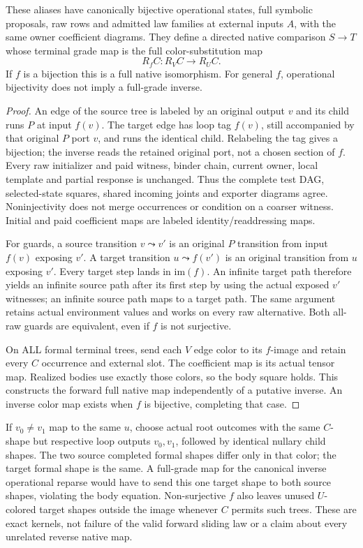 \documentclass[11pt]{article}
\begin{document}
\begin{theorem}
These aliases have canonically bijective operational states, full symbolic proposals, raw rows and admitted law families at external inputs $A$, with the same owner coefficient diagrams. They define a directed native comparison $S\to T$ whose terminal grade map is the full color-substitution map
\[
                    R_fC:R_VC\longrightarrow R_UC.
\]
If $f$ is a bijection this is a full native isomorphism. For general $f$, operational bijectivity does not imply a full-grade inverse.
\end{theorem}
\begin{proof}
An edge of the source tree is labeled by an original output $v$ and its child runs $P$ at input $f(v)$. The target edge has loop tag $f(v)$, still accompanied by that original $P$ port $v$, and runs the identical child. Relabeling the tag gives a bijection; the inverse reads the retained original port, not a chosen section of $f$. Every raw initializer and paid witness, binder chain, current owner, local template and partial response is unchanged. Thus the complete test DAG, selected-state squares, shared incoming joints and exporter diagrams agree. Noninjectivity does not merge occurrences or condition on a coarser witness. Initial and paid coefficient maps are labeled identity/readdressing maps.

For guards, a source transition $v\leadsto v'$ is an original $P$ transition from input $f(v)$ exposing $v'$. A target transition $u\leadsto f(v')$ is an original transition from $u$ exposing $v'$. Every target step lands in $\mathrm{im}(f)$. An infinite target path therefore yields an infinite source path after its first step by using the actual exposed $v'$ witnesses; an infinite source path maps to a target path. The same argument retains actual environment values and works on every raw alternative. Both all-raw guards are equivalent, even if $f$ is not surjective.

On ALL formal terminal trees, send each $V$ edge color to its $f$-image and retain every $C$ occurrence and external slot. The coefficient map is its actual tensor map. Realized bodies use exactly those colors, so the body square holds. This constructs the forward full native map independently of a putative inverse. An inverse color map exists when $f$ is bijective, completing that case.
\end{proof}

If $v_0\ne v_1$ map to the same $u$, choose actual root outcomes with the same $C$-shape but respective loop outputs $v_0,v_1$, followed by identical nullary child shapes. The two source completed formal shapes differ only in that color; the target formal shape is the same. A full-grade map for the canonical inverse operational reparse would have to send this one target shape to both source shapes, violating the body equation. Non-surjective $f$ also leaves unused $U$-colored target shapes outside the image whenever $C$ permits such trees. These are exact kernels, not failure of the valid forward sliding law or a claim about every unrelated reverse native map.
\end{document}
